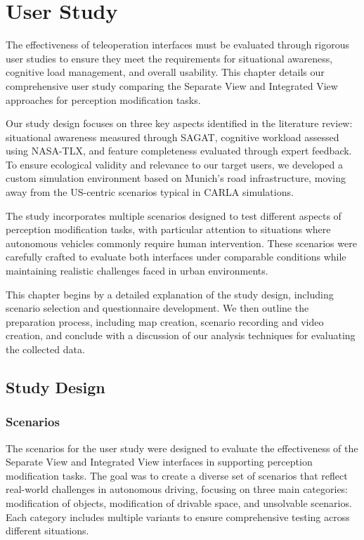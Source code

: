 
\chapter{User Study}\label{chapter:userstudy}
The effectiveness of teleoperation interfaces must be evaluated through rigorous user studies to ensure they meet the requirements for situational awareness, cognitive load management, and overall usability. This chapter details our comprehensive user study comparing the Separate View and Integrated View approaches for perception modification tasks.

Our study design focuses on three key aspects identified in the literature review: situational awareness measured through SAGAT, cognitive workload assessed using NASA-TLX, and feature completeness evaluated through expert feedback. To ensure ecological validity and relevance to our target users, we developed a custom simulation environment based on Munich's road infrastructure, moving away from the US-centric scenarios typical in CARLA simulations.

The study incorporates multiple scenarios designed to test different aspects of perception modification tasks, with particular attention to situations where autonomous vehicles commonly require human intervention. These scenarios were carefully crafted to evaluate both interfaces under comparable conditions while maintaining realistic challenges faced in urban environments.

This chapter begins by a detailed explanation of the study design, including scenario selection and questionnaire development. We then outline the preparation process, including map creation, scenario recording and video creation, and conclude with a discussion of our analysis techniques for evaluating the collected data.

\section{Study Design}


\subsection{Scenarios}
The scenarios for the user study were designed to evaluate the effectiveness of the Separate View and Integrated View interfaces in supporting perception modification tasks. The goal was to create a diverse set of scenarios that reflect real-world challenges in autonomous driving, focusing on three main categories: modification of objects, modification of drivable space, and unsolvable scenarios. Each category includes multiple variants to ensure comprehensive testing across different situations.
